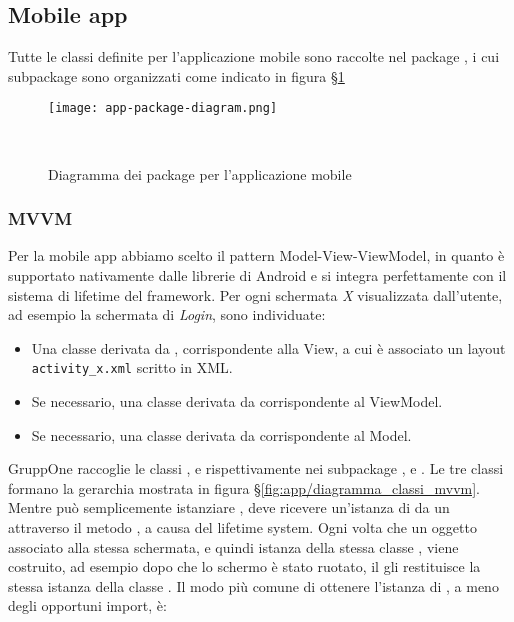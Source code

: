 \documentclass[../../manuale-sviluppatore.tex]{subfiles}
\begin{document}
\subsection{Mobile app}%
\label{sub:mobile_app}

Tutte le classi definite per l'applicazione mobile sono raccolte nel package , i cui subpackage sono organizzati come indicato in figura §\ref{fig:app/diagramma_package}
\begin{figure}[h]
  \centering
  \texttt{[image: app-package-diagram.png]}
  \caption{Diagramma dei package per l'applicazione mobile}
~~\label{fig:app/diagramma_package}
\end{figure}

\subsubsection{MVVM}%
\label{subs:mvvm}

Per la mobile app abbiamo scelto il pattern Model-View-ViewModel, in quanto è supportato nativamente dalle librerie di Android e si integra perfettamente con il sistema di lifetime del framework. Per ogni schermata \textit{X} visualizzata dall'utente, ad esempio la schermata di \textit{Login}, sono individuate:
\begin{itemize}
  \item Una classe  derivata da , corrispondente alla View, a cui è associato un layout \linebreak[1]\texttt{activity\_x.xml} scritto in XML\@.
  \item Se necessario, una classe  derivata da  corrispondente al ViewModel.
  \item Se necessario, una classe  derivata da  corrispondente al Model.
\end{itemize}

GruppOne raccoglie le classi ,  e  rispettivamente nei subpackage ,  e .
Le tre classi formano la gerarchia mostrata in figura §\ref{fig:app/diagramma_classi_mvvm}.
Mentre  può semplicemente istanziare ,  deve ricevere un'istanza di  da un  attraverso il metodo , a causa del lifetime system.
Ogni volta che un oggetto associato alla stessa schermata, e quindi istanza della stessa classe , viene costruito, ad esempio dopo che lo schermo è stato ruotato, il  gli restituisce la stessa istanza della classe .
Il modo più comune di ottenere l'istanza di , a meno degli opportuni import, è:
\end{document}
